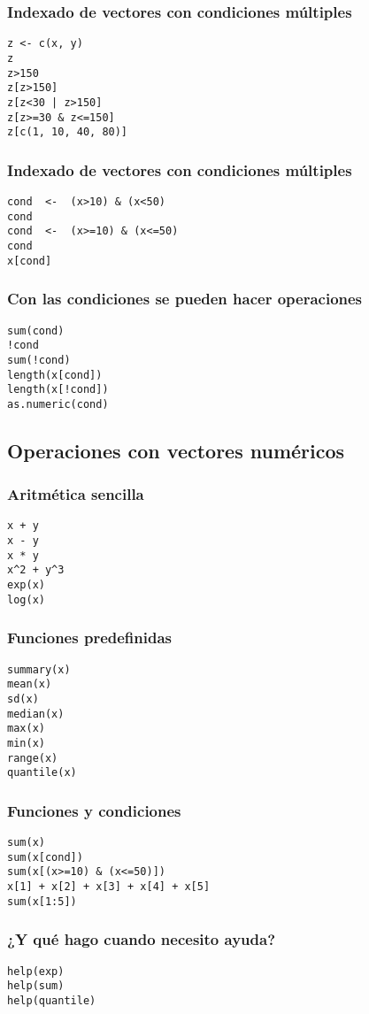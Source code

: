 \documentclass[bigger]{beamer}
\begin{document}
\begin{frame}[fragile]
\frametitle{Indexado de vectores con condiciones múltiples}
\label{sec-1-1-11}



\lstset{language=R}
\begin{lstlisting}
z <- c(x, y)
z
z>150
z[z>150]
z[z<30 | z>150]
z[z>=30 & z<=150]
z[c(1, 10, 40, 80)]
\end{lstlisting}
\end{frame}
\begin{frame}[fragile]
\frametitle{Indexado de vectores con condiciones múltiples}
\label{sec-1-1-12}


\lstset{language=R}
\begin{lstlisting}
cond  <-  (x>10) & (x<50)
cond
cond  <-  (x>=10) & (x<=50)
cond
x[cond]
\end{lstlisting}
\end{frame}
\begin{frame}[fragile]
\frametitle{Con las condiciones se pueden hacer operaciones}
\label{sec-1-1-13}


\lstset{language=R}
\begin{lstlisting}
sum(cond)
!cond
sum(!cond)
length(x[cond])
length(x[!cond])
as.numeric(cond)
\end{lstlisting}
\end{frame}
\subsection{Operaciones con vectores numéricos}
\label{sec-1-2}
\begin{frame}[fragile]
\frametitle{Aritmética sencilla}
\label{sec-1-2-1}


\lstset{language=R}
\begin{lstlisting}
x + y
x - y
x * y
x^2 + y^3
exp(x)
log(x)
\end{lstlisting}
\end{frame}
\begin{frame}[fragile]
\frametitle{Funciones predefinidas}
\label{sec-1-2-2}


\lstset{language=R}
\begin{lstlisting}
summary(x)
mean(x)
sd(x)
median(x)
max(x)
min(x)
range(x)
quantile(x)
\end{lstlisting}
\end{frame}
\begin{frame}[fragile]
\frametitle{Funciones y condiciones}
\label{sec-1-2-3}


\lstset{language=R}
\begin{lstlisting}
sum(x)
sum(x[cond])
sum(x[(x>=10) & (x<=50)])
x[1] + x[2] + x[3] + x[4] + x[5]
sum(x[1:5])
\end{lstlisting}
\end{frame}
\begin{frame}[fragile]
\frametitle{¿Y qué hago cuando necesito ayuda?}
\label{sec-1-2-4}



\lstset{language=R}
\begin{lstlisting}
help(exp)
help(sum)
help(quantile)
\end{lstlisting}
\end{frame}
\end{document}
